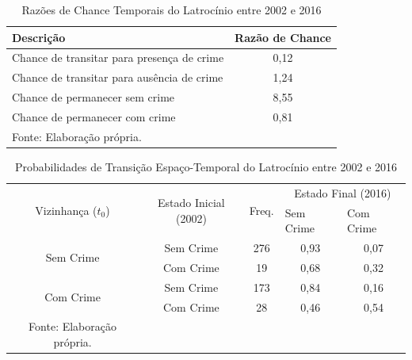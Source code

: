 \documentclass[12pt,openright,oneside,a4paper,english,french,spanish]{abntex2}
\numberwithin{table}{section} %
\numberwithin{figure}{section} %
\begin{document}
\begin{subappendices}
\begin{table}[H]
\centering
\caption{Razões de Chance Temporais do Latrocínio entre 2002 e 2016}
        \begin{tabular}{lc}
            \hline
            {\textbf{Descrição}} & {\textbf{Razão de Chance}} \\\hline
            {Chance de transitar para presença de crime} & {0,12} \\
            {Chance de transitar para ausência de crime} & {1,24} \\
            {Chance de permanecer sem crime} & {8,55} \\
            {Chance de permanecer com crime} & {0,81} \\\hline
            \tiny Fonte: Elaboração própria.
        \end{tabular}
    \label{tab:odds_tempo_latrocinio_2002_2016}
\end{table}


\begin{table}[H]
\centering
\caption{Probabilidades de Transição Espaço-Temporal do Latrocínio entre 2002 e 2016}
        \begin{tabular}{ccccc}
            \hline
            \multirow{2}{*}{Vizinhança ($t_0$)} & \multirow{2}{*}{Estado Inicial (2002)} & \multirow{2}{*}{Freq.} & \multicolumn{2}{c}{Estado Final (2016)}  \\\cline{4-5} %
                                        & & & \multicolumn{1}{l}{Sem Crime} & \multicolumn{1}{l}{Com Crime} \\\hline
            \multirow{2}{*}{Sem Crime} & {Sem Crime} & 276 &  {0,93} & {0,07} \\
                                       & {Com Crime} & 19 &   {0,68} & {0,32} \\\hline
            \multirow{2}{*}{Com Crime} & {Sem Crime} & 173 &  {0,84} & {0,16} \\
                                       & {Com Crime} & 28 &   {0,46} & {0,54} \\\hline
            \tiny Fonte: Elaboração própria.
        \end{tabular}
    \label{tab:prob_espaco_tempo_latrocinio_2002_2016}
\end{table}



\end{subappendices}
\end{document}
